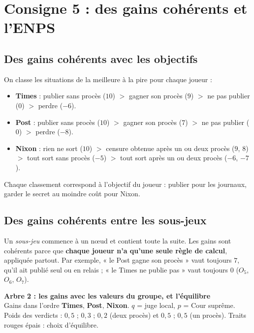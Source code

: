 \documentclass[11pt,a4paper]{article}
\theoremstyle{definition}
\newcommand{\T}[1]{\textcolor{nyt}{#1}}
\newcommand{\W}[1]{\textcolor{wp}{#1}}
\newcommand{\N}[1]{\textcolor{gov}{#1}}
\begin{document}
\section{Consigne 5 : des gains cohérents et l'ENPS}

\subsection{Des gains cohérents avec les objectifs}
On classe les situations de la meilleure à la pire pour chaque joueur :
\begin{itemize}[leftmargin=*,itemsep=2pt]
\item \T{\textbf{Times}} : publier sans procès ($10$) $>$ gagner son procès ($9$) $>$ ne pas publier ($0$) $>$ perdre ($-6$).
\item \W{\textbf{Post}} : publier sans procès ($10$) $>$ gagner son procès ($7$) $>$ ne pas publier ($0$) $>$ perdre ($-8$).
\item \N{\textbf{Nixon}} : rien ne sort ($10$) $>$ censure obtenue après un ou deux procès ($9$, $8$) $>$ tout sort sans procès ($-5$) $>$ tout sort après un ou deux procès ($-6$, $-7$).
\end{itemize}
Chaque classement correspond à l'objectif du joueur : publier pour les journaux, garder le secret au moindre coût pour Nixon.

\subsection{Des gains cohérents entre les sous-jeux}
Un \emph{sous-jeu} commence à un nœud et contient toute la suite. Les gains sont cohérents parce que \textbf{chaque joueur n'a qu'une seule règle de calcul}, appliquée partout. Par exemple, « le Post gagne son procès » vaut toujours $7$, qu'il ait publié seul ou en relais ; « le Times ne publie pas » vaut toujours $0$ ($O_5$, $O_6$, $O_7$).

\begin{landscape}
\begin{center}{\large\bfseries Arbre 2 : les gains avec les valeurs du groupe, et l'équilibre}\\[2pt]{\small Gains dans l'ordre \textcolor{nyt}{\textbf{Times}}, \textcolor{wp}{\textbf{Post}}, \textcolor{gov}{\textbf{Nixon}}. $q$ = juge local, $p$ = Cour suprême. Poids des verdicts : $0{,}5$ ; $0{,}3$ ; $0{,}2$ (deux procès) et $0{,}5$ ; $0{,}5$ (un procès). Traits rouges épais : choix d'équilibre.}\end{center}\vspace{-4pt}
\noindent\resizebox{\linewidth}{!}{}
\end{landscape}
\end{document}
